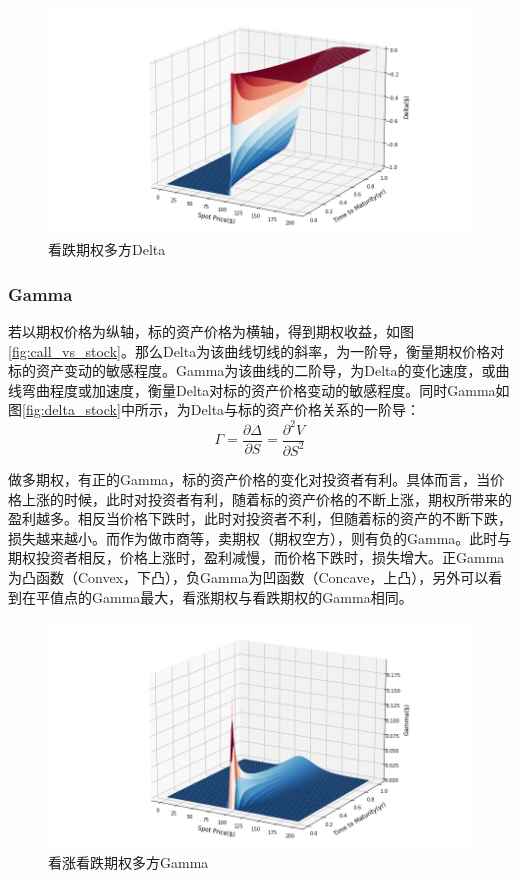 \documentclass[11pt]{article}
\begin{document}
\begin{figure}[H]
    \centering
    \includegraphics[width=\textwidth]{fig/delta_put_surf.png}
    \caption{看跌期权多方Delta}
    \label{fig:delta_put_surf}
\end{figure}

\subsubsection{Gamma}

若以期权价格为纵轴，标的资产价格为横轴，得到期权收益，如图\ref{fig:call_vs_stock}。那么Delta为该曲线切线的斜率，为一阶导，衡量期权价格对标的资产变动的敏感程度。Gamma为该曲线的二阶导，为Delta的变化速度，或曲线弯曲程度或加速度，衡量Delta对标的资产价格变动的敏感程度。同时Gamma如图\ref{fig:delta_stock}中所示，为Delta与标的资产价格关系的一阶导：
\begin{equation*}
    \Gamma = \frac{\partial \Delta}{\partial S} = \frac{\partial^2 V}{\partial S^2}
\end{equation*}

做多期权，有正的Gamma，标的资产价格的变化对投资者有利。具体而言，当价格上涨的时候，此时对投资者有利，随着标的资产价格的不断上涨，期权所带来的盈利越多。相反当价格下跌时，此时对投资者不利，但随着标的资产的不断下跌，损失越来越小。而作为做市商等，卖期权（期权空方），则有负的Gamma。此时与期权投资者相反，价格上涨时，盈利减慢，而价格下跌时，损失增大。正Gamma为凸函数（Convex，下凸），负Gamma为凹函数（Concave，上凸），另外可以看到在平值点的Gamma最大，看涨期权与看跌期权的Gamma相同。
\begin{figure}[H]
    \centering
    \includegraphics[width=\textwidth]{fig/gamma_surf.png}
    \caption{看涨看跌期权多方Gamma}
    \label{fig:gamma_surf}
\end{figure}
\end{document}
